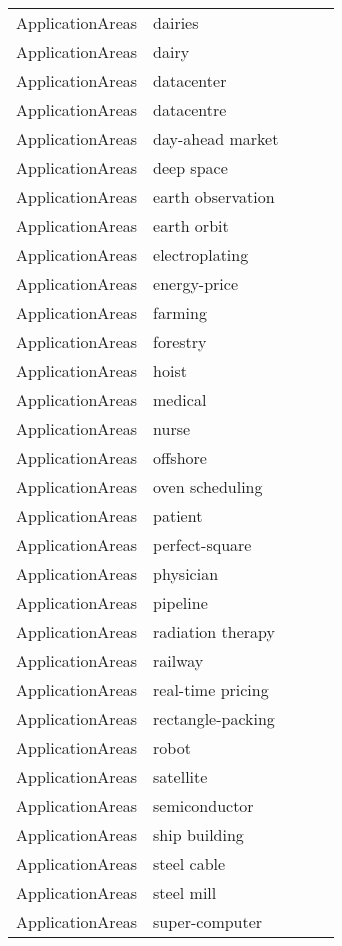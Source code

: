 {\begin{longtable}{lp{3cm}>{\raggedright}p{6cm}>{\raggedright}p{6cm}p{8cm}}
ApplicationAreas & dairies &  &  & \\
ApplicationAreas & dairy &  &  & \\
ApplicationAreas & datacenter &  &  & \\
ApplicationAreas & datacentre &  &  & \\
ApplicationAreas & day-ahead market &  &  & \\
ApplicationAreas & deep space &  &  & \\
ApplicationAreas & earth observation &  &  & \\
ApplicationAreas & earth orbit &  &  & \\
ApplicationAreas & electroplating &  &  & \\
ApplicationAreas & energy-price &  &  & \\
ApplicationAreas & farming &  &  & \\
ApplicationAreas & forestry &  &  & \\
ApplicationAreas & hoist &  &  & \\
ApplicationAreas & medical &  &  & \\
ApplicationAreas & nurse &  &  & \\
ApplicationAreas & offshore &  &  & \\
ApplicationAreas & oven scheduling &  &  & \\
ApplicationAreas & patient &  &  & \\
ApplicationAreas & perfect-square &  &  & \\
ApplicationAreas & physician &  &  & \\
ApplicationAreas & pipeline &  &  & \\
ApplicationAreas & radiation therapy &  &  & \\
ApplicationAreas & railway &  &  & \\
ApplicationAreas & real-time pricing &  &  & \\
ApplicationAreas & rectangle-packing &  &  & \\
ApplicationAreas & robot &  &  & \\
ApplicationAreas & satellite &  &  & \\
ApplicationAreas & semiconductor &  &  & \\
ApplicationAreas & ship building &  &  & \\
ApplicationAreas & steel cable &  &  & \\
ApplicationAreas & steel mill &  &  & \\
ApplicationAreas & super-computer &  &  & \\

\end{longtable}}
